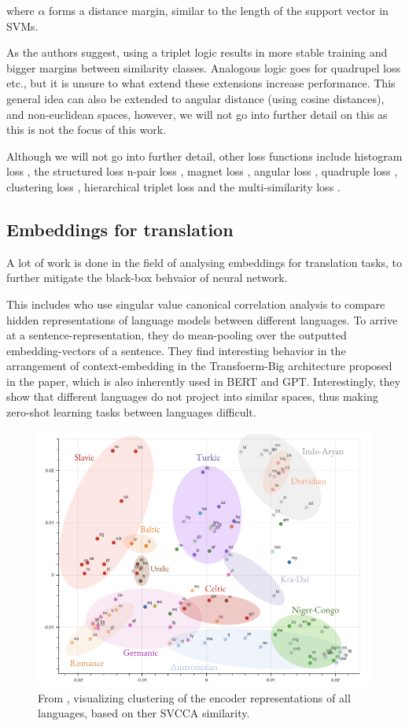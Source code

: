 \documentclass[a4paper,12pt,oneside,openright]{report}
\begin{document}
where $\alpha$ forms a distance margin, similar to the length of the support vector in SVMs.

As the authors suggest, using a triplet logic results in more stable training and bigger margins between similarity classes.
Analogous logic goes for quadrupel loss etc., but it is unsure to what extend these extensions increase performance.
This general idea can also be extended to angular distance (using cosine distances), and non-euclidean spaces, however, we will not go into further detail on this as this is not the focus of this work.

Although we will not go into further detail, other loss functions include histogram loss \cite{ustinova16}, the structured loss \cite{song16} n-pair loss \cite{sohn16}, magnet loss \cite{rippel16}, angular loss \cite{wang17}, quadruple loss \cite{ni17}, clustering loss \cite{song17}, hierarchical triplet loss \cite{ge18} and the multi-similarity loss \cite{wang19c}.

\subsection{Embeddings for translation}

A lot of work is done in the field of analysing embeddings for translation tasks, to further mitigate the black-box behvaior of neural network.

This includes \cite{kudugunta18} who use singular value canonical correlation analysis to compare hidden representations of language models between different languages.
To arrive at a sentence-representation, they do mean-pooling over the outputted embedding-vectors of a sentence. 
They find interesting behavior in the arrangement of context-embedding in the Transfoerm-Big architecture proposed in the \cite{vaswani17} paper, which is also inherently used in BERT and GPT.
Interestingly, they show that different languages do not project into similar spaces, thus making zero-shot learning tasks between languages difficult.


\begin{figure}[h]
	\center
  \includegraphics[width=0.6\linewidth]{./assets/relatedwork/embeddings_by_language.png}
  \caption{From \cite{kudugunta18}, visualizing clustering of the encoder representations of all languages, based on ther SVCCA similarity.}
  \label{fig:embeddings_by_language}
\end{figure}
\end{document}
